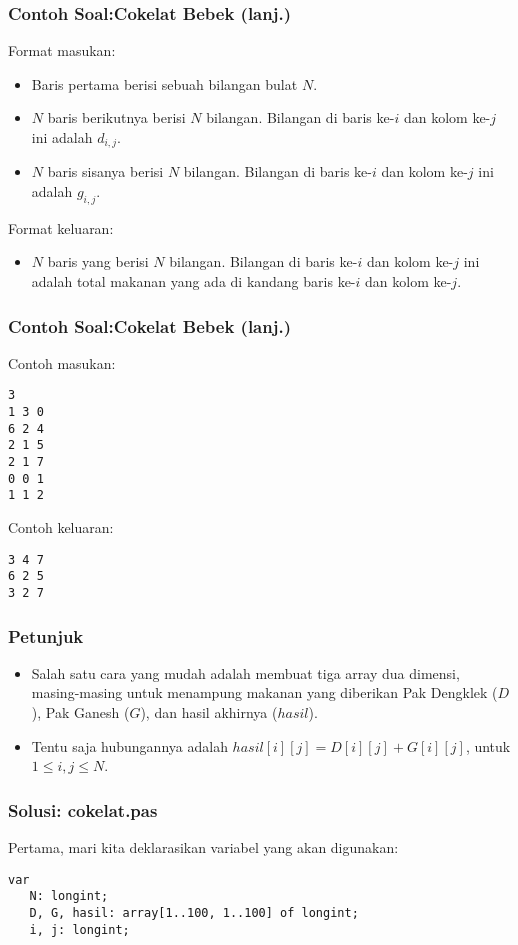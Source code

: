 \documentclass{beamer}
\begin{document}
\begin{frame}
\frametitle{Contoh Soal:\newline Cokelat Bebek (lanj.)}
Format masukan:
\begin{itemize}
	\item Baris pertama berisi sebuah bilangan bulat $N$.
	\item $N$ baris berikutnya berisi $N$ bilangan. Bilangan di baris ke-$i$ dan kolom ke-$j$ ini adalah $d_{i,j}$.
	\item $N$ baris sisanya berisi $N$ bilangan. Bilangan di baris ke-$i$ dan kolom ke-$j$ ini adalah $g_{i,j}$.
\end{itemize}
Format keluaran:
\begin{itemize}
	\item $N$ baris yang berisi $N$ bilangan. Bilangan di baris ke-$i$ dan kolom ke-$j$ ini adalah total makanan yang ada di kandang baris ke-$i$ dan kolom ke-$j$.
\end{itemize}
\end{frame}

\begin{frame}[fragile]
\frametitle{Contoh Soal:\newline Cokelat Bebek (lanj.)}
Contoh masukan:
\begin{lstlisting}
3
1 3 0
6 2 4
2 1 5
2 1 7
0 0 1
1 1 2
\end{lstlisting}
Contoh keluaran:
\begin{lstlisting}
3 4 7
6 2 5
3 2 7
\end{lstlisting}
\end{frame}

\begin{frame}
\frametitle{Petunjuk}
\begin{itemize}
	\item Salah satu cara yang mudah adalah membuat tiga array dua dimensi, masing-masing untuk menampung makanan yang diberikan Pak Dengklek ($D$), Pak Ganesh ($G$), dan hasil akhirnya ($hasil$).
	\item Tentu saja hubungannya adalah $hasil[i][j] = D[i][j] + G[i][j]$, untuk $1 \le i,j \le N$.
\end{itemize}
\end{frame}

\begin{frame}[fragile]
\frametitle{Solusi: cokelat.pas}
Pertama, mari kita deklarasikan variabel yang akan digunakan:
\begin{lstlisting}
var
   N: longint;
   D, G, hasil: array[1..100, 1..100] of longint;
   i, j: longint;
   
\end{lstlisting}
\end{frame}
\end{document}

